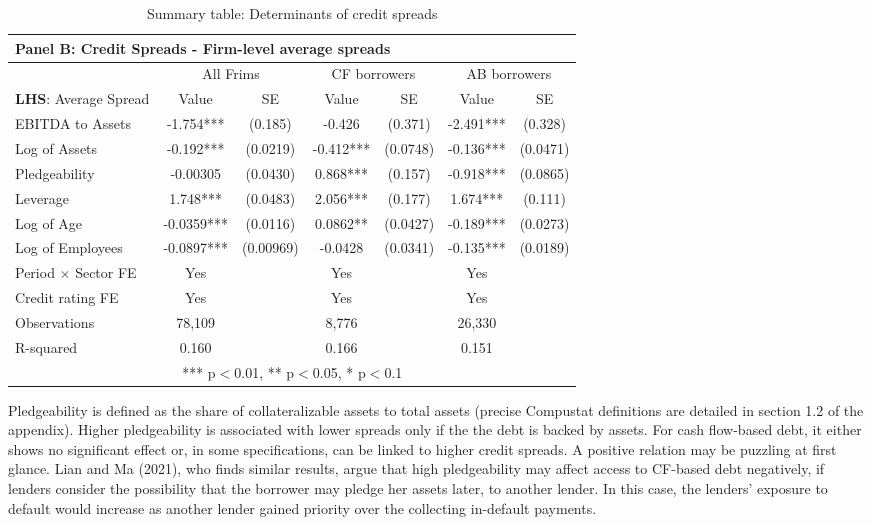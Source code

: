 \documentclass[12pt]{article}
\begin{document}
\begin{table}[H]
{\begin{tabular}{lcccccc}
    \multicolumn{7}{l}{Panel B: \textbf{Credit Spreads - Firm-level average spreads}} \\    
    \toprule
    & \multicolumn{2}{c}{All Frims} & \multicolumn{2}{c}{CF borrowers} & \multicolumn{2}{c}{AB borrowers} \\
    \cmidrule(lr){2-3} \cmidrule(lr){4-5} \cmidrule(lr){6-7}
    \textbf{LHS}: Average Spread & Value & SE & Value & SE & Value & SE \\
    \midrule
    EBITDA to Assets & -1.754*** & (0.185) & -0.426 & (0.371) & -2.491*** & (0.328) \\
    Log of Assets & -0.192*** & (0.0219) & -0.412*** & (0.0748) & -0.136*** & (0.0471) \\
    Pledgeability & -0.00305 & (0.0430) & 0.868*** & (0.157) & -0.918*** & (0.0865) \\
    Leverage & 1.748*** & (0.0483) & 2.056*** & (0.177) & 1.674*** & (0.111) \\
    Log of Age & -0.0359*** & (0.0116) & 0.0862** & (0.0427) & -0.189*** & (0.0273) \\
    Log of Employees & -0.0897*** & (0.00969) & -0.0428 & (0.0341) & -0.135*** & (0.0189) \vspace{2mm} \\
    \midrule
    Period $\times$ Sector FE & Yes & & Yes & & Yes & \\
    Credit rating FE & Yes & & Yes & & Yes & \\
    Observations & 78,109 & & 8,776 & & 26,330 & \\
    R-squared & 0.160 & & 0.166 & & 0.151 & \\
    \bottomrule
    \multicolumn{7}{c}{*** p$<$0.01, ** p$<$0.05, * p$<$0.1} \\
    \end{tabular}%
    }
    \caption{Summary table: Determinants of credit spreads}
\end{table}
\noindent 
Pledgeability is defined as the share of collateralizable assets to total assets (precise Compustat definitions are detailed in section 1.2 of the appendix). Higher pledgeability is associated with lower spreads only if the the debt is backed by assets. For cash flow-based debt, it either shows no significant effect or, in some specifications, can be linked to higher credit spreads. A positive relation may be puzzling at first glance. Lian and Ma (2021), who finds similar results, argue that high pledgeability may affect access to CF-based debt negatively, if lenders consider the possibility that the borrower may pledge her assets later, to another lender. In this case, the lenders' exposure to default would increase as another lender gained priority over the collecting in-default payments.   \vspace{3mm} \\
\end{document}
